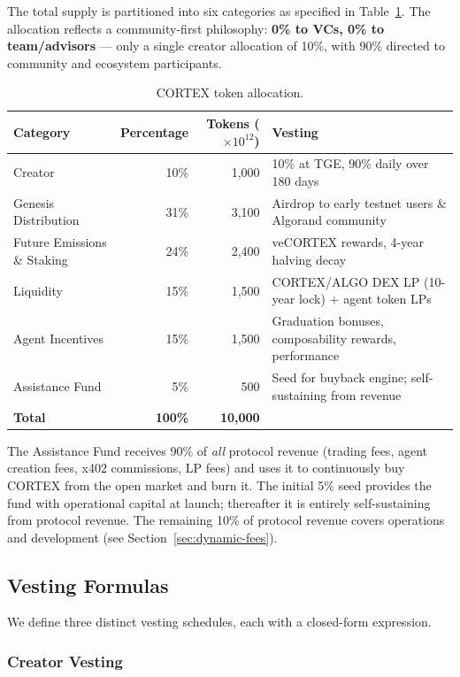 The total supply is partitioned into six categories as specified in
Table~\ref{tab:allocation}. The allocation reflects a community-first
philosophy: \textbf{0\% to VCs, 0\% to team/advisors} --- only a single
creator allocation of 10\%, with 90\% directed to community and ecosystem
participants.

\begin{table}[H]
\centering
\caption{CORTEX token allocation.}
\label{tab:allocation}
\begin{tabular}{@{}lrrl@{}}
\toprule
\textbf{Category} & \textbf{Percentage} & \textbf{Tokens ($\times 10^{12}$)} & \textbf{Vesting} \\
\midrule
Creator & 10\% & 1{,}000 & 10\% at TGE, 90\% daily over 180 days \\
Genesis Distribution & 31\% & 3{,}100 & Airdrop to early testnet users \& Algorand community \\
Future Emissions \& Staking & 24\% & 2{,}400 & veCORTEX rewards, 4-year halving decay \\
Liquidity & 15\% & 1{,}500 & CORTEX/ALGO DEX LP (10-year lock) + agent token LPs \\
Agent Incentives & 15\% & 1{,}500 & Graduation bonuses, composability rewards, performance \\
Assistance Fund & 5\% & 500 & Seed for buyback engine; self-sustaining from revenue \\
\midrule
\textbf{Total} & \textbf{100\%} & \textbf{10{,}000} & \\
\bottomrule
\end{tabular}
\end{table}

The Assistance Fund receives 90\% of \emph{all} protocol revenue (trading
fees, agent creation fees, x402 commissions, LP fees) and uses it to
continuously buy CORTEX from the open market and burn it. The initial 5\%
seed provides the fund with operational capital at launch; thereafter it is
entirely self-sustaining from protocol revenue. The remaining 10\% of
protocol revenue covers operations and development (see
Section~\ref{sec:dynamic-fees}).

\subsection{Vesting Formulas}
\label{subsec:vesting}

We define three distinct vesting schedules, each with a closed-form expression.

\subsubsection{Creator Vesting}

